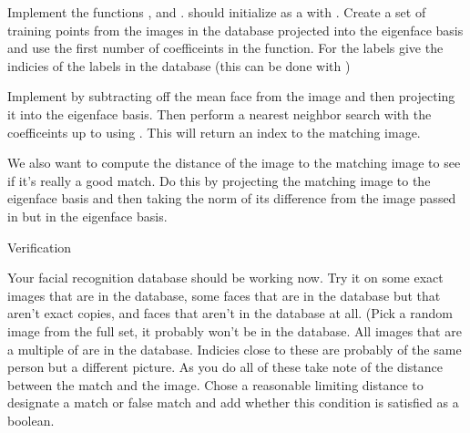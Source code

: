 \begin{problem}
Implement the functions , and .
 should initialize  as a  with .
Create a set of training points from the images in the database projected into the eigenface basis and use the first  number of coefficeints in the  function.
For the labels give the indicies of the labels in the database (this can be done with )

Implement  by subtracting off the mean face from the image and then projecting it into the eigenface basis.
Then perform a nearest neighbor search with the coefficeints up to  using .
This will return an index to the matching image.

We also want to compute the distance of the image to the matching image to see if it's really a good match.
Do this by projecting the matching image to the eigenface basis and then taking the norm of its difference from the image passed in but in the eigenface basis.
\end{problem}

\begin{problem}
Verification

Your facial recognition database should be working now.
Try it on some exact images that are in the database, some faces that are in the database but that aren't exact copies, and faces that aren't in the database at all.
(Pick a random image from the full set, it probably won't be in the database. 
 All images that are a multiple of  are in the database.
 Indicies close to these are probably of the same person but a different picture.
 As you do all of these take note of the distance between the match and the image.
 Chose a reasonable limiting distance to designate a match or false match and add whether this condition is satisfied as a boolean.
\end{problem}